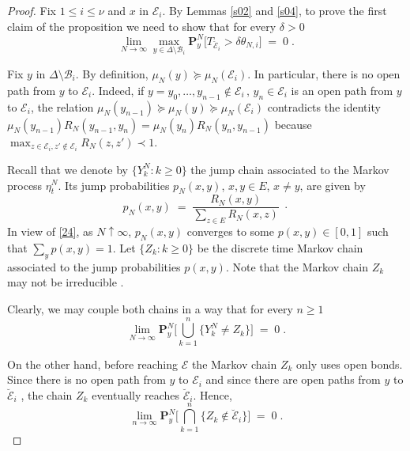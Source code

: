 \documentclass[reqno]{amsart}
\begin{document}
\begin{proof}
Fix $1\le i\le \nu$ and $x$ in ${{\mathcal E}}_i$.  By Lemmas \ref{s02} and
\ref{s04}, to prove the first claim of the proposition we need to show
that for every $\delta>0$
\begin{equation*}
\lim_{N\to \infty} \max_{y\in \Delta \setminus {{\mathcal B}}_i}
{{\mathbf P}}_y^N \big[ T_{\breve{{{\mathcal E}}}_i} > \delta \theta_{N,i} \big]\; =\;
0\; .
\end{equation*}

Fix $y$ in $\Delta \setminus {{\mathcal B}}_i$. By definition, $\mu_N(y)
\succeq \mu_N({{\mathcal E}}_i)$. In particular, there is no open path from $y$
to ${{\mathcal E}}_i$. Indeed, if $y=y_0, \dots, y_{n-1}\not\in{{\mathcal E}}_i \,,\,
y_n\in{{\mathcal E}}_i$ is an open path from $y$ to ${{\mathcal E}}_i$, the relation
$\mu_N(y_{n-1}) \succeq \mu_N(y) \succeq \mu_N({{\mathcal E}}_i)$ contradicts
the identity $\mu_N(y_{n-1}) R_N(y_{n-1}, y_n) = \mu_N(y_{n}) R_N(y_n,
y_{n-1})$ because $\max_{z\in{{\mathcal E}}_i, z'\not\in{{\mathcal E}}_i} R_N(z,z') \prec
1$.

Recall that we denote by $\{Y^N_k : k\ge 0\}$ the jump
chain associated to the Markov process $\eta^N_t$. Its jump
probabilities $p_N(x,y)$, $x,y\in E$, $x\not =y$, are given by
\begin{equation*}
p_N(x,y) \;=\; \frac{R_N(x,y)}{\sum_{z\in E} R_N(x,z)} \; \cdot
\end{equation*} 
In view of \eqref{24}, as $N\uparrow\infty$, $p_N(x,y)$ converges to
some $p(x,y) \in [0,1]$ such that $\sum_y p(x,y)=1$.  Let $\{Z_k :
k\ge 0\}$ be the discrete time Markov chain associated to the jump
probabilities $p(x,y)$. Note that the Markov chain $Z_k$ may not be
irreducible .

Clearly, we may couple both chains in a way that for every $n\ge 1$
\begin{equation}
\label{28}
\lim_{N\to\infty}
{{\mathbf P}}_y^N \Big[ \bigcup_{k=1}^n \{Y^N_k \not = Z_k\} \Big] \;=\; 0\; .
\end{equation}

On the other hand, before reaching ${{\mathcal E}}$ the Markov chain $Z_k$ only
uses open bonds. Since there is no open path from $y$ to ${{\mathcal E}}_i$ and
since there are open paths from $y$ to $\breve{{{\mathcal E}}}_i$ , the chain
$Z_k$ eventually reaches $\breve{{{\mathcal E}}}_i$.  Hence,
\begin{equation*}
\lim_{n\to\infty}
{{\mathbf P}}_y^N \Big[ \bigcap_{k=1}^n \{Z_k \not \in \breve{{{\mathcal E}}}_i\} \Big] 
\;=\; 0\; .
\end{equation*}


\end{proof}
\end{document}
